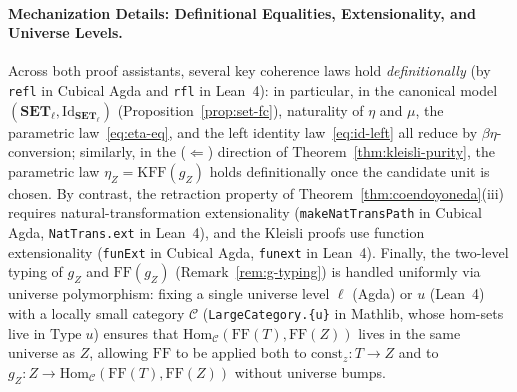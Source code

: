 \documentclass[11pt,a4paper]{article}
\theoremstyle{definition}
\theoremstyle{remark}
\newcommand{\Set}{\mathbf{SET}}
\newcommand{\Hom}{\mathrm{Hom}}
\newcommand{\Id}{\mathrm{Id}}
\newcommand{\FF}{\mathrm{FF}}
\newcommand{\KFF}{\mathrm{KFF}}
\newcommand{\const}{\mathrm{const}}
\begin{document}
\paragraph{Mechanization Details: Definitional Equalities, Extensionality, and Universe Levels.}
Across both proof assistants, several key coherence laws hold \emph{definitionally} (by \texttt{refl}
in Cubical Agda and \texttt{rfl} in Lean~4): in particular, in the canonical model
$(\Set_\ell, \Id_{\Set_\ell})$ (Proposition~\ref{prop:set-fc}), naturality of $\eta$ and $\mu$, the
parametric law~\eqref{eq:eta-eq}, and the left identity law~\eqref{eq:id-left} all reduce by
$\beta\eta$-conversion; similarly, in the ($\Longleftarrow$) direction of Theorem~\ref{thm:kleisli-purity},
the parametric law $\eta_Z = \KFF(g_Z)$ holds definitionally once the candidate unit is chosen. By
contrast, the retraction property of Theorem~\ref{thm:coendoyoneda}(iii) requires natural-transformation
extensionality (\texttt{makeNatTransPath} in Cubical Agda, \texttt{NatTrans.ext} in Lean~4), and the
Kleisli proofs use function extensionality (\texttt{funExt} in Cubical Agda, \texttt{funext} in Lean~4).
Finally, the two-level typing of $g_Z$ and $\FF(g_Z)$ (Remark~\ref{rem:g-typing}) is handled uniformly
via universe polymorphism: fixing a single universe level $\ell$ (Agda) or $u$ (Lean~4) with a
locally small category $\mathcal{C}$ (\texttt{LargeCategory.\{u\}} in Mathlib, whose hom-sets live in
$\mathrm{Type}\;u$) ensures that $\Hom_{\mathcal{C}}(\FF(T), \FF(Z))$ lives in the same universe as $Z$,
allowing $\FF$ to be applied both to $\const_z : T \to Z$ and to
$g_Z : Z \to \Hom_{\mathcal{C}}(\FF(T), \FF(Z))$ without universe bumps.
\end{document}

